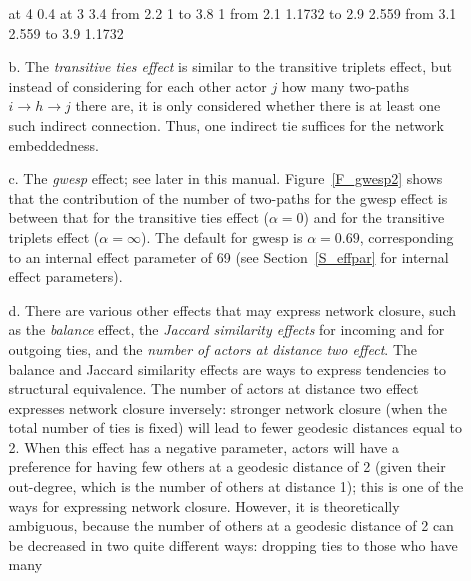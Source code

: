 \documentclass[a4paper,fleqn,11pt]{article}
\newcommand{\+}{\, + \,}
\begin{document}
\begin{enumerate}
\begin{enumerate}
\begin{minipage}[t]{.2\textwidth}
\begin{center}
 at 4 0.4
 at 3 3.4
\arrow <2mm> [.2,.6]  from 2.2 1 to 3.8 1
\arrow <2mm> [.2,.6]  from 2.1 1.1732 to 2.9 2.559
\arrow <2mm> [.2,.6]  from 3.1 2.559 to 3.9 1.1732
\endpicture
\end{center}
\end{minipage}
      \item[b.] The \emph{transitive ties effect} is similar to the transitive
                triplets effect, but instead of considering for each other actor $j$
                how many two-paths $i \rightarrow h \rightarrow j $ there are,
                it is only considered whether there is at least one such indirect connection.
                Thus, one indirect tie suffices for the network embeddedness.
      \item[c.] The \emph{gwesp} effect; see later in this manual.
                Figure~\ref{F_gwesp2} shows that the contribution of the number of
                two-paths for the gwesp effect is between that for the transitive
                ties effect ($\alpha = 0$) and for the transitive
                triplets effect ($\alpha = \infty$). The default for gwesp
                is  $\alpha = 0.69$, corresponding to an internal effect
                parameter of 69 (see Section~\ref{S_effpar} for internal effect
                parameters).
      \item[d.] There are various other effects that may express network closure,
                such as the \emph{balance} effect, the
                \emph{Jaccard similarity effects} for incoming and for outgoing ties,
                and the \emph{number of actors at distance two effect}.
                The balance and Jaccard similarity effects are ways to express
                tendencies to structural equivalence.
                The number of actors at distance two effect expresses network
                closure inversely:
                stronger network closure (when the total number of ties is fixed)
                will lead to fewer geodesic distances equal to 2.
                When this effect has a negative parameter, actors will have a preference
                for having few others at a geodesic distance of 2 (given their
                out-degree, which is the number of others at distance 1);
                this is one of the ways for expressing network closure.
                However, it is theoretically ambiguous, because the number of
                others at a geodesic distance of 2 can be decreased in two
                quite different ways: dropping ties to those who have many

\end{enumerate}
\end{enumerate}
\end{document}
